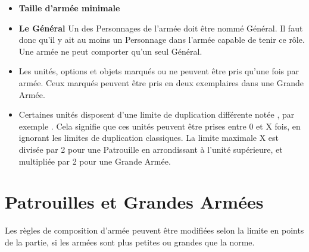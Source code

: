 \begin{itemize}[label={\textbullet}]
\item \textbf{Taille d'armée minimale}\newline
{}
\item \textbf{Le Général}\newline
Un des Personnages de l'armée doit être nommé Général. Il faut donc qu'il y ait au moins un Personnage dans l'armée capable de tenir ce rôle. Une armée ne peut comporter qu'un seul Général.
\item \textbf{}\newline
Les unités, options et objets marqués \oneofakind{} ou \oneperarmy{} ne peuvent être pris qu'une fois par armée. Ceux marqués \oneofakind{} peuvent être pris en deux exemplaires dans une Grande Armée.
\item \textbf{}\newline
Certaines unités disposent d'une limite de duplication différente notée , par exemple . Cela signifie que ces unités peuvent être prises entre 0 et X fois, en ignorant les limites de duplication classiques. La limite maximale X est divisée par 2 pour une Patrouille en arrondissant à l'unité supérieure, et multipliée par 2 pour une Grande Armée.
\end{itemize}

\newpage
\section{Patrouilles et Grandes Armées}

Les règles de composition d'armée peuvent être modifiées selon la limite en points de la partie, si les armées sont plus petites ou grandes que la norme.

